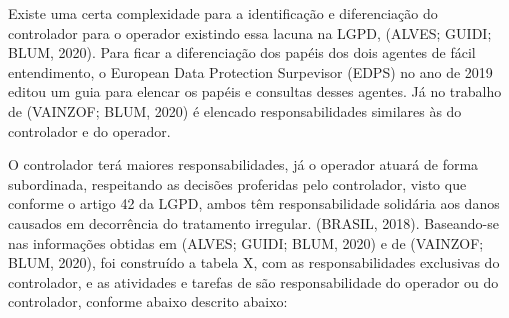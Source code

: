 \documentclass[
	12pt,				%
	openright,			%
	oneside,			%
	a4paper,			%
	english,			%
	french,				%
	spanish,			%
	brazil,				%
	]{abntex2}
\begin{document}
Existe uma certa complexidade para a identificação e diferenciação do controlador para o operador existindo essa lacuna na LGPD, (ALVES; GUIDI; BLUM, 2020). Para ficar a diferenciação dos papéis dos dois agentes de fácil entendimento, o European Data Protection Surpevisor (EDPS) no ano de 2019 editou um guia para elencar os papéis e consultas desses agentes. Já no trabalho de (VAINZOF; BLUM, 2020) é elencado responsabilidades similares às do controlador e do operador.

O controlador terá maiores responsabilidades, já o operador atuará de forma subordinada, respeitando as decisões proferidas pelo controlador, visto que conforme o artigo 42 da LGPD, ambos têm responsabilidade solidária aos danos causados em decorrência do tratamento irregular. (BRASIL, 2018).  Baseando-se nas informações obtidas em (ALVES; GUIDI; BLUM, 2020) e de (VAINZOF; BLUM, 2020), foi construído a tabela X, com as responsabilidades exclusivas do controlador, e as atividades e tarefas de são responsabilidade do operador ou do controlador, conforme abaixo descrito  abaixo:
\end{document}
